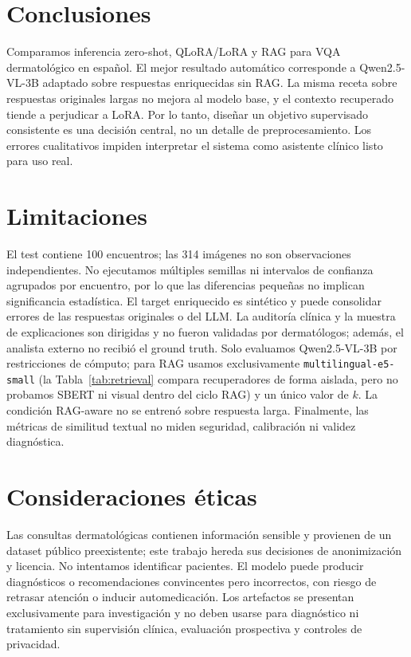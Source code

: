 \documentclass[11pt]{article}
\begin{document}
\section{Conclusiones}

Comparamos inferencia zero-shot, QLoRA/LoRA y RAG para VQA dermatológico en español. El mejor resultado automático corresponde a Qwen2.5-VL-3B adaptado sobre respuestas enriquecidas sin RAG. La misma receta sobre respuestas originales largas no mejora al modelo base, y el contexto recuperado tiende a perjudicar a LoRA. Por lo tanto, diseñar un objetivo supervisado consistente es una decisión central, no un detalle de preprocesamiento. Los errores cualitativos impiden interpretar el sistema como asistente clínico listo para uso real.

\section*{Limitaciones}

El test contiene 100 encuentros; las 314 imágenes no son observaciones independientes. No ejecutamos múltiples semillas ni intervalos de confianza agrupados por encuentro, por lo que las diferencias pequeñas no implican significancia estadística. El target enriquecido es sintético y puede consolidar errores de las respuestas originales o del LLM. La auditoría clínica y la muestra de explicaciones son dirigidas y no fueron validadas por dermatólogos; además, el analista externo no recibió el ground truth. Solo evaluamos Qwen2.5-VL-3B por restricciones de cómputo; para RAG usamos exclusivamente \texttt{multilingual-e5-small} (la Tabla~\ref{tab:retrieval} compara recuperadores de forma aislada, pero no probamos SBERT ni visual dentro del ciclo RAG) y un único valor de $k$. La condición RAG-aware no se entrenó sobre respuesta larga. Finalmente, las métricas de similitud textual no miden seguridad, calibración ni validez diagnóstica.

\section*{Consideraciones éticas}

Las consultas dermatológicas contienen información sensible y provienen de un dataset público preexistente; este trabajo hereda sus decisiones de anonimización y licencia. No intentamos identificar pacientes. El modelo puede producir diagnósticos o recomendaciones convincentes pero incorrectos, con riesgo de retrasar atención o inducir automedicación. Los artefactos se presentan exclusivamente para investigación y no deben usarse para diagnóstico ni tratamiento sin supervisión clínica, evaluación prospectiva y controles de privacidad.
\end{document}
